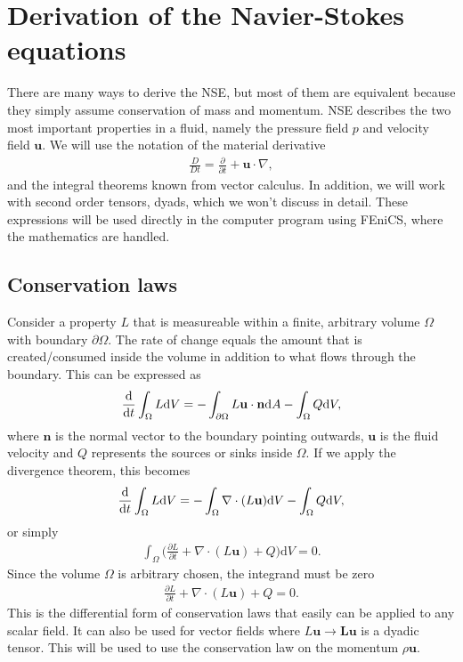 \documentclass[a4paper,10pt]{article}
\renewcommand{\vec}[1]{\mathbf{#1}}
\renewcommand{\(}{\left(}
\renewcommand{\)}{\right)}
\newcommand{\dm}[1]{\text{d}#1}
\newcommand{\dpart}[2]{\frac{\partial#1}{\partial#2}}
\begin{document}
\section{Derivation of the Navier-Stokes equations}
There are many ways to derive the NSE, but most of them are equivalent because they simply assume conservation of mass and momentum. NSE describes the two most important properties in a fluid, namely the pressure field $p$ and velocity field $\vec u$. We will use the notation of the material derivative 
\begin{align*}
  \frac{D}{Dt} = \dpart{}{t} + \vec u \cdot \nabla,
\end{align*}
and the integral theorems known from vector calculus. In addition, we will work with second order tensors, dyads, which we won't discuss in detail. These expressions will be used directly in the computer program using FEniCS\cite{fenics}, where the mathematics are handled.

\subsection{Conservation laws}
Consider a property $L$ that is measureable within a finite, arbitrary volume $\Omega$ with boundary $\partial \Omega$. The rate of change equals the amount that is created/consumed inside the volume in addition to what flows through the boundary. This can be expressed as
\begin{align*}
  \frac{\dm }{\dm t} \int_\Omega L \dm V = -\int_{\partial \Omega} L\vec u \cdot \vec n \dm A - \int_\Omega Q \dm V,
\end{align*}
where $\vec n$ is the normal vector to the boundary pointing outwards, $\vec u$ is the fluid velocity and $Q$ represents the sources or sinks inside $\Omega$. If we apply the divergence theorem, this becomes
\begin{align*}
  \frac{\dm }{\dm t} \int_\Omega L \dm V = -\int_{\Omega} \nabla \cdot (L\vec u) \dm V - \int_\Omega Q \dm V,
\end{align*}
or simply
\begin{align*}
\int_\Omega \Bigg(\dpart{L}{t} + \nabla \cdot (L\vec u) + Q \Bigg)\dm V = 0.
\end{align*}
Since the volume $\Omega$ is arbitrary chosen, the integrand must be zero
\begin{align}
  \label{eq:conservation_law}
  \dpart{L}{t} + \nabla \cdot (L\vec u) + Q = 0.
\end{align}
This is the differential form of conservation laws that easily can be applied to any scalar field. It can also be used for vector fields where $L\vec u\rightarrow\vec L\vec u$ is a dyadic tensor. This will be used to use the conservation law on the momentum $\rho \vec u$.
\end{document}
